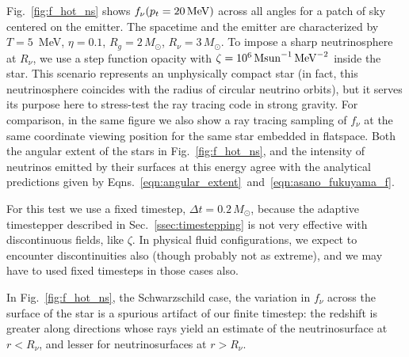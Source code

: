 Fig.~\ref{fig:f_hot_ns} shows $f_\nu(p_t=20\,{\rm MeV})$ across all angles for
a patch of sky centered on the emitter. The spacetime and the emitter are
characterized by $T=5$~MeV, $\eta=0.1$, $R_g=2\,M_\odot$, $R_\nu=3\,M_\odot$.
To impose a sharp neutrinosphere at $R_\nu$, we use a step function opacity
with $\zeta=10^6\,{\rm Msun}^{-1}\,{\rm MeV}^{-2}$ inside the star.
This scenario represents an unphysically compact star (in fact, this
neutrinosphere coincides with the radius of circular neutrino orbits), but it
serves its purpose here to stress-test the ray tracing code in strong gravity.
For comparison, in the same figure we also show a ray tracing sampling of $f_\nu$
at the same coordinate viewing position for the same star embedded in flatspace.
Both the angular extent of the stars in Fig.~\ref{fig:f_hot_ns}, and the
intensity of neutrinos emitted by their surfaces at this energy agree
with the analytical predictions given by
Eqns.~\ref{eqn:angular_extent}~and~\ref{eqn:asano_fukuyama_f}.

For this test we use a fixed timestep, $\Delta t = 0.2\,M_\odot$,
because the adaptive timestepper described in Sec.~\ref{ssec:timestepping} is
not very effective with discontinuous fields, like $\zeta$. In physical
fluid configurations, we expect to encounter discontinuities also (though
probably not as extreme), and we may have to used fixed timesteps in those
cases also.

In Fig.~\ref{fig:f_hot_ns}, the Schwarzschild case, the variation in $f_\nu$
across the surface of the star is a spurious artifact of our finite timestep:
the redshift is greater along directions whose rays yield an estimate of the
neutrinosurface at $r<R_\nu$, and lesser for neutrinosurfaces at $r>R_\nu$.

